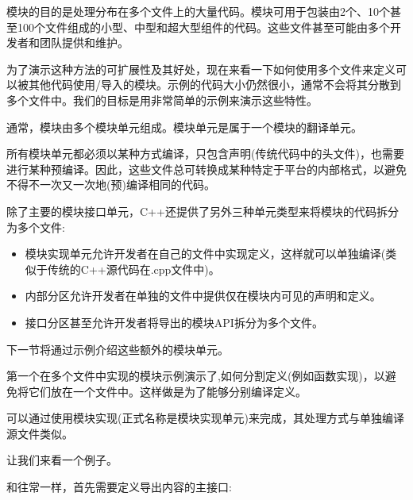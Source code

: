 

模块的目的是处理分布在多个文件上的大量代码。模块可用于包装由2个、10个甚至100个文件组成的小型、中型和超大型组件的代码。这些文件甚至可能由多个开发者和团队提供和维护。

为了演示这种方法的可扩展性及其好处，现在来看一下如何使用多个文件来定义可以被其他代码使用/导入的模块。示例的代码大小仍然很小，通常不会将其分散到多个文件中。我们的目标是用非常简单的示例来演示这些特性。


通常，模块由多个模块单元组成。模块单元是属于一个模块的翻译单元。

所有模块单元都必须以某种方式编译，只包含声明(传统代码中的头文件)，也需要进行某种预编译。因此，这些文件总可转换成某种特定于平台的内部格式，以避免不得不一次又一次地(预)编译相同的代码。

除了主要的模块接口单元，C++还提供了另外三种单元类型来将模块的代码拆分为多个文件:

\begin{itemize}
\item 
模块实现单元允许开发者在自己的文件中实现定义，这样就可以单独编译(类似于传统的C++源代码在.cpp文件中)。

\item 
内部分区允许开发者在单独的文件中提供仅在模块内可见的声明和定义。

\item 
接口分区甚至允许开发者将导出的模块API拆分为多个文件。
\end{itemize}

下一节将通过示例介绍这些额外的模块单元。


第一个在多个文件中实现的模块示例演示了,如何分割定义(例如函数实现)，以避免将它们放在一个文件中。这样做是为了能够分别编译定义。

可以通过使用模块实现(正式名称是模块实现单元)来完成，其处理方式与单独编译源文件类似。

让我们来看一个例子。


和往常一样，首先需要定义导出内容的主接口:


